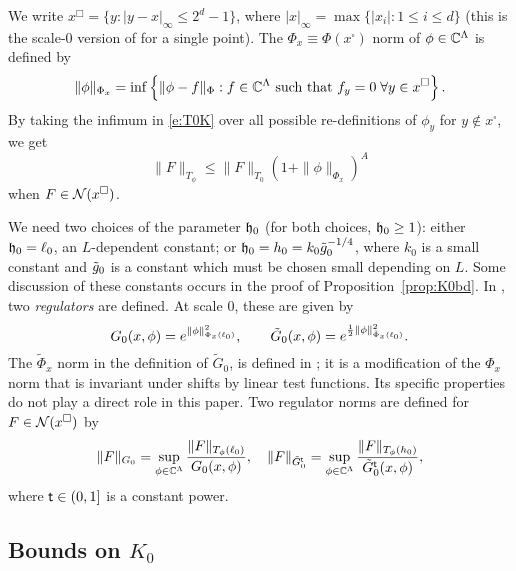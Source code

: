 We write $x^\Box = \{y: |y-x|_\infty \le 2^d-1\}$,
where $|x|_\infty = \max\{|x_i| : 1 \le i \le d\}$
(this is the scale-0 version
of \cite[\eqref{IE-e:ssn}]{BS-rg-IE} for a single point).
The $\Phi_x \equiv \Phi(x^\square)$ norm of $\phi \in \mathbb{C}^\Lambda$ is defined by
\begin{equation}
\|\phi\|_{\Phi_x}
  =
\inf
\left\{
  \|\phi - f\|_\Phi : f \in \mathbb{C}^\Lambda \text{ such that } f_y = 0 \;\forall y \in x^\square
\right\}
.
\end{equation}
By taking the infimum in \eqref{e:T0K} over all possible
re-definitions of $\phi_y$ for $y \notin x^\square$, we get
\begin{equation}
\label{e:T0Kx}
\|F\|_{T_\phi}
  \leq
\|F\|_{T_0} (1 + \|\phi\|_{\Phi_x})^A
\end{equation}
when $F \in \mathcal{N}(x^\square)$.

We need two choices of the parameter $\mathfrak{h}_0$ (for both choices, $\mathfrak{h}_0 \ge 1$):
either $\mathfrak{h}_0 = \ell_0$, an $L$-dependent constant;
or $\mathfrak{h}_0 = h_0 = k_0 \tilde{g}_0^{-1/4}$, where $k_0$ is a small constant and
$\tilde{g}_0$ is a constant which must be chosen small depending on $L$.
Some discussion of these constants occurs in the
proof of Proposition~\ref{prop:K0bd}.
In \cite{BS-rg-IE}, two \emph{regulators} are defined.
At scale $0$, these are given by
\begin{equation}
\lbeq{regdef}
G_0(x, \phi)
  = e^{\|\phi\|^2_{\Phi_x(\ell_0)}},
  \qquad
\tilde G_0(x, \phi)
  =
e^{\frac{1}{2} \|\phi\|^2_{\tilde\Phi_x(\ell_0)}}.
\end{equation}
The $\tilde \Phi_x$ norm in the definition of $\tilde G_0$,
is defined in \cite[\eqref{IE-e:Phitilnorm}]{BS-rg-IE};
it is a modification of the $\Phi_x$ norm that is invariant under shifts by
linear test functions.  Its specific properties do not play a direct role  in this paper.
Two regulator norms are defined for $F \in \mathcal{N}(x^\square)$ by
\begin{equation}
\lbeq{reg0}
    \|F\|_{G_0} = \sup_{\phi\in\C^\Lambda} \frac{\|F\|_{T_\phi(\ell_0)}}{G_0(x,\phi)}
    , \quad
    \|F\|_{\tilde{G}^{\sf t}_0} = \sup_{\phi\in\C^\Lambda} \frac{\|F\|_{T_\phi(h_0)}}{\tilde{G}^{\sf t}_0(x,\phi)}
    ,
\end{equation}
where ${\sf t} \in (0, 1]$ is a constant power.


\subsection{Bounds on \texorpdfstring{$K_0$}{K0}}
\label{sec:K0bds}

